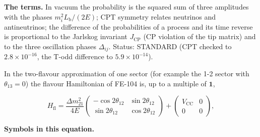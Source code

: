 \documentclass[
  10pt,
]{article}
\begin{document}
\textbf{The terms.} In vacuum the probability is the squared sum of
three amplitudes with the phases \(m_i^2L_{\mathrm{b}}/(2E)\); CPT
symmetry relates neutrinos and antineutrinos; the difference of the
probabilities of a process and its time reverse is proportional to the
Jarlskog invariant \(J_{\mathrm{CP}}\) (CP violation of the tip matrix)
and to the three oscillation phases \(\Delta_{ij}\). Status: STANDARD
(CPT checked to \(2.8\times10^{-16}\), the T-odd difference to
\(5.9\times10^{-14}\)).

In the two-flavour approximation of one sector (for example the 1-2
sector with \(\theta_{13} = 0\)) the flavour Hamiltonian of FE-104 is,
up to a multiple of \(\mathbf{1}\),

\[
H_{\mathrm{fl}} = \frac{\Delta m_{21}^2}{4E}\begin{pmatrix}-\cos2\theta_{12} & \sin2\theta_{12}\\ \sin2\theta_{12} &
 \cos2\theta_{12}\end{pmatrix} + \begin{pmatrix}V_{\mathrm{CC}} & 0\\ 0 & 0\end{pmatrix},
\]

\textbf{Symbols in this equation.}
\end{document}

